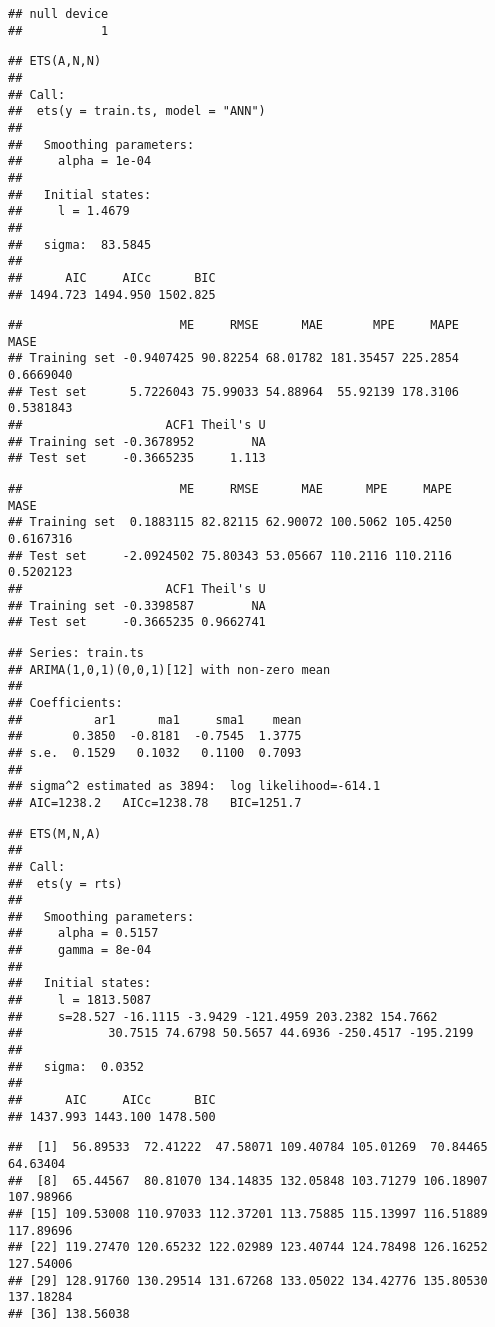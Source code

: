\documentclass[]{article}
\begin{document}
\begin{verbatim}
## null device 
##           1
\end{verbatim}

\begin{verbatim}
## ETS(A,N,N) 
## 
## Call:
##  ets(y = train.ts, model = "ANN") 
## 
##   Smoothing parameters:
##     alpha = 1e-04 
## 
##   Initial states:
##     l = 1.4679 
## 
##   sigma:  83.5845
## 
##      AIC     AICc      BIC 
## 1494.723 1494.950 1502.825
\end{verbatim}

\begin{verbatim}
##                      ME     RMSE      MAE       MPE     MAPE      MASE
## Training set -0.9407425 90.82254 68.01782 181.35457 225.2854 0.6669040
## Test set      5.7226043 75.99033 54.88964  55.92139 178.3106 0.5381843
##                    ACF1 Theil's U
## Training set -0.3678952        NA
## Test set     -0.3665235     1.113
\end{verbatim}

\begin{verbatim}
##                      ME     RMSE      MAE      MPE     MAPE      MASE
## Training set  0.1883115 82.82115 62.90072 100.5062 105.4250 0.6167316
## Test set     -2.0924502 75.80343 53.05667 110.2116 110.2116 0.5202123
##                    ACF1 Theil's U
## Training set -0.3398587        NA
## Test set     -0.3665235 0.9662741
\end{verbatim}

\begin{verbatim}
## Series: train.ts 
## ARIMA(1,0,1)(0,0,1)[12] with non-zero mean 
## 
## Coefficients:
##          ar1      ma1     sma1    mean
##       0.3850  -0.8181  -0.7545  1.3775
## s.e.  0.1529   0.1032   0.1100  0.7093
## 
## sigma^2 estimated as 3894:  log likelihood=-614.1
## AIC=1238.2   AICc=1238.78   BIC=1251.7
\end{verbatim}

\begin{verbatim}
## ETS(M,N,A) 
## 
## Call:
##  ets(y = rts) 
## 
##   Smoothing parameters:
##     alpha = 0.5157 
##     gamma = 8e-04 
## 
##   Initial states:
##     l = 1813.5087 
##     s=28.527 -16.1115 -3.9429 -121.4959 203.2382 154.7662
##            30.7515 74.6798 50.5657 44.6936 -250.4517 -195.2199
## 
##   sigma:  0.0352
## 
##      AIC     AICc      BIC 
## 1437.993 1443.100 1478.500
\end{verbatim}

\begin{verbatim}
##  [1]  56.89533  72.41222  47.58071 109.40784 105.01269  70.84465  64.63404
##  [8]  65.44567  80.81070 134.14835 132.05848 103.71279 106.18907 107.98966
## [15] 109.53008 110.97033 112.37201 113.75885 115.13997 116.51889 117.89696
## [22] 119.27470 120.65232 122.02989 123.40744 124.78498 126.16252 127.54006
## [29] 128.91760 130.29514 131.67268 133.05022 134.42776 135.80530 137.18284
## [36] 138.56038
\end{verbatim}
\end{document}
